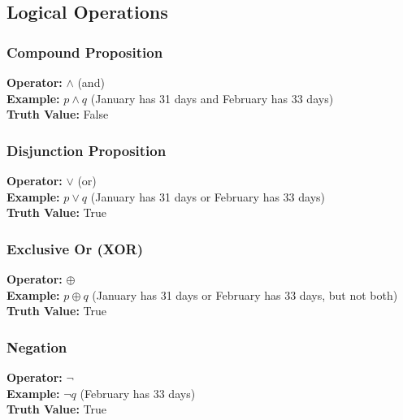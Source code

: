 \documentclass{article}
\begin{document}
\subsection{Logical Operations}
\subsubsection{Compound Proposition}
\newline\newline
\textbf{Operator:} $\land$ (and)  \\
\textbf{Example:} $p \land q$ (January has 31 days and February has 33 days)  \\
\textbf{Truth Value:} False

\subsubsection{Disjunction Proposition}
\textbf{Operator:} $\lor$ (or)  \\
\textbf{Example:} $p \lor q$ (January has 31 days or February has 33 days)  \\
\textbf{Truth Value:} True

\subsubsection{Exclusive Or (XOR)}
\textbf{Operator:} $\oplus$  \\
\textbf{Example:} $p \oplus q$ (January has 31 days or February has 33 days, but not both)  \\
\textbf{Truth Value:} True

\subsubsection{Negation}
\textbf{Operator:} $\neg$  \\
\textbf{Example:} $\neg q$ (February has 33 days)  \\
\textbf{Truth Value:} True
\end{document}
